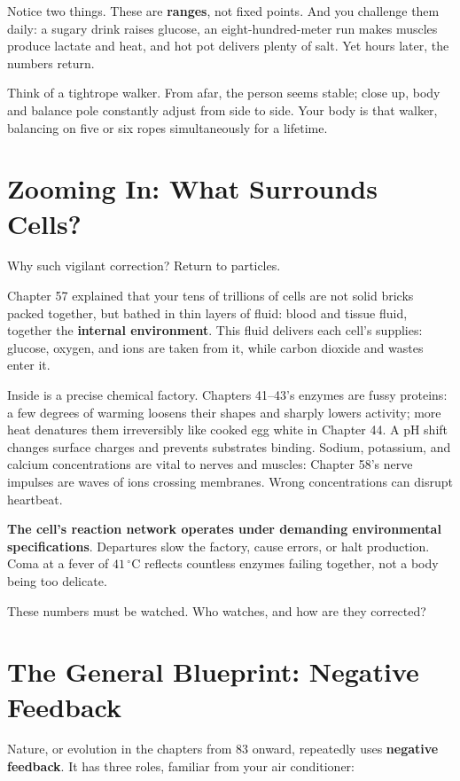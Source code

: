 Notice two things. These are \textbf{ranges}, not fixed points. And you challenge them daily: a sugary drink raises glucose, an eight-hundred-meter run makes muscles produce lactate and heat, and hot pot delivers plenty of salt. Yet hours later, the numbers return.

Think of a tightrope walker. From afar, the person seems stable; close up, body and balance pole constantly adjust from side to side. Your body is that walker, balancing on five or six ropes simultaneously for a lifetime.

\section{Zooming In: What Surrounds Cells?}

Why such vigilant correction? Return to particles.

Chapter 57 explained that your tens of trillions of cells are not solid bricks packed together, but bathed in thin layers of fluid: blood and tissue fluid, together the \textbf{internal environment}. This fluid delivers each cell's supplies: glucose, oxygen, and ions are taken from it, while carbon dioxide and wastes enter it.

Inside is a precise chemical factory. Chapters 41--43's enzymes are fussy proteins: a few degrees of warming loosens their shapes and sharply lowers activity; more heat denatures them irreversibly like cooked egg white in Chapter 44. A pH shift changes surface charges and prevents substrates binding. Sodium, potassium, and calcium concentrations are vital to nerves and muscles: Chapter 58's nerve impulses are waves of ions crossing membranes. Wrong concentrations can disrupt heartbeat.

\textbf{The cell's reaction network operates under demanding environmental specifications}. Departures slow the factory, cause errors, or halt production. Coma at a fever of $41\,^{\circ}\mathrm{C}$ reflects countless enzymes failing together, not a body being too delicate.

These numbers must be watched. Who watches, and how are they corrected?

\section{The General Blueprint: Negative Feedback}

Nature, or evolution in the chapters from 83 onward, repeatedly uses \textbf{negative feedback}. It has three roles, familiar from your air conditioner:

